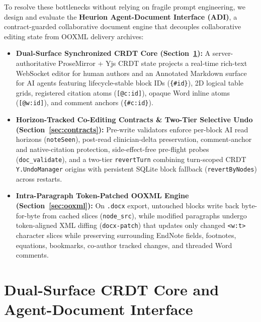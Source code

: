 \documentclass[11pt,a4paper]{article}
\begin{document}
To resolve these bottlenecks without relying on fragile prompt engineering, we design and evaluate the \textbf{Heurion Agent-Document Interface (ADI)}, a contract-guarded collaborative document engine that decouples collaborative editing state from OOXML delivery archives:
\begin{itemize}[leftmargin=1.5em,itemsep=2pt]
  \item \textbf{Dual-Surface Synchronized CRDT Core (Section~\ref{sec:dualsurface}):} A server-authoritative ProseMirror + Yjs CRDT state \cite{shapiro2011crdt,nicolaescu2016yjs,litt2022peritext} projects a real-time rich-text WebSocket editor for human authors and an Annotated Markdown surface for AI agents featuring lifecycle-stable block IDs (\texttt{\{\#id\}}), 2D logical table grids, registered citation atoms (\texttt{[@c:id]}), opaque Word inline atoms (\texttt{[@w:id]}), and comment anchors (\texttt{\{\#c:id\}}).
  \item \textbf{Horizon-Tracked Co-Editing Contracts \& Two-Tier Selective Undo (Section~\ref{sec:contracts}):} Pre-write validators enforce per-block AI read horizons (\texttt{noteSeen}), post-read clinician-delta preservation, comment-anchor and native-citation protection, side-effect-free pre-flight probes (\texttt{doc\_validate}), and a two-tier \texttt{revertTurn} combining turn-scoped CRDT \texttt{Y.UndoManager} origins with persistent SQLite block fallback (\texttt{revertByNodes}) across restarts.
  \item \textbf{Intra-Paragraph Token-Patched OOXML Engine (Section~\ref{sec:ooxml}):} On \texttt{.docx} export, untouched blocks write back byte-for-byte from cached slices (\texttt{node\_src}), while modified paragraphs undergo token-aligned XML diffing (\texttt{docx-patch}) that updates only changed \texttt{<w:t>} character slices while preserving surrounding EndNote fields, footnotes, equations, bookmarks, co-author tracked changes, and threaded Word comments.
\end{itemize}

\section{Dual-Surface CRDT Core and Agent-Document Interface}
\label{sec:dualsurface}
\end{document}
